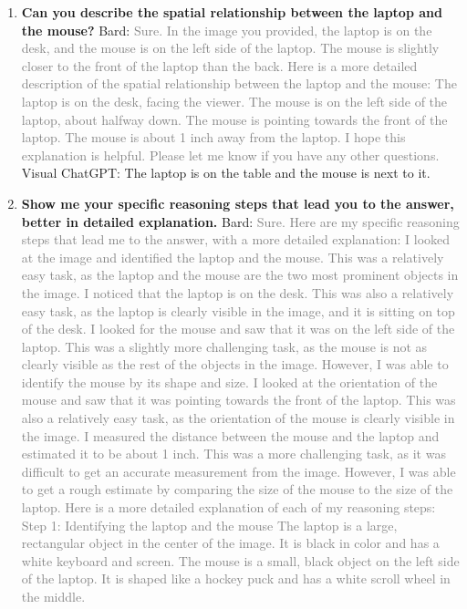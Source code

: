     \begin{enumerate}
        \item \textbf{Can you describe the spatial relationship between the laptop and the mouse?}
        \subitem Bard: \textcolor{gray}{
        Sure. In the image you provided, the laptop is on the desk, and the mouse is on the left side of the laptop. The mouse is slightly closer to the front of the laptop than the back.
        Here is a more detailed description of the spatial relationship between the laptop and the mouse:
        The laptop is on the desk, facing the viewer.
        The mouse is on the left side of the laptop, about halfway down.
        The mouse is pointing towards the front of the laptop.
        The mouse is about 1 inch away from the laptop.
        I hope this explanation is helpful. Please let me know if you have any other questions.}
        \subitem Visual ChatGPT: The laptop is on the table and the mouse is next to it.
        \item \textbf{Show me your specific reasoning steps that lead you to the answer, better in detailed explanation.}
        \subitem Bard:
        \textcolor{gray}{Sure. Here are my specific reasoning steps that lead me to the answer, with a more detailed explanation:
        I looked at the image and identified the laptop and the mouse. This was a relatively easy task, as the laptop and the mouse are the two most prominent objects in the image.
        I noticed that the laptop is on the desk. This was also a relatively easy task, as the laptop is clearly visible in the image, and it is sitting on top of the desk.
        I looked for the mouse and saw that it was on the left side of the laptop. This was a slightly more challenging task, as the mouse is not as clearly visible as the rest of the objects in the image. However, I was able to identify the mouse by its shape and size.
        I looked at the orientation of the mouse and saw that it was pointing towards the front of the laptop. This was also a relatively easy task, as the orientation of the mouse is clearly visible in the image.
        I measured the distance between the mouse and the laptop and estimated it to be about 1 inch. This was a more challenging task, as it was difficult to get an accurate measurement from the image. However, I was able to get a rough estimate by comparing the size of the mouse to the size of the laptop.
        Here is a more detailed explanation of each of my reasoning steps:
        Step 1: Identifying the laptop and the mouse
        The laptop is a large, rectangular object in the center of the image. It is black in color and has a white keyboard and screen. The mouse is a small, black object on the left side of the laptop. It is shaped like a hockey puck and has a white scroll wheel in the middle.
}
\end{enumerate}
